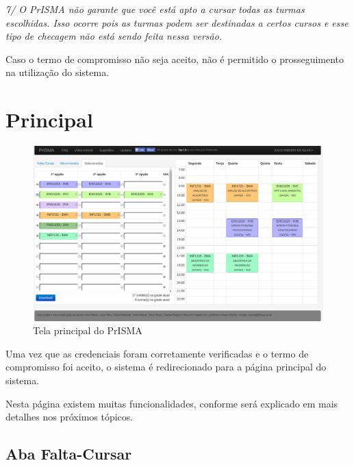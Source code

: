 \documentclass[graduacao,brazil]{ThesisPUC}
\begin{document}
\textit{7/ O PrISMA não garante que você está apto a cursar todas as turmas escolhidas. Isso ocorre pois as turmas podem ser destinadas a certos cursos e esse tipo de checagem não está sendo feita nessa versão.}

\vspace{3 mm}

Caso o termo de compromisso não seja aceito, não é permitido o prosseguimento na  utilização do sistema.

\section{Principal}

\begin{figure}[H]
    \centering
    \includegraphics[width=0.85\linewidth]{img/v3_selecionadas.png}
    \caption{Tela principal do PrISMA}
\end{figure}

Uma vez que as credenciais foram corretamente verificadas e o termo de compromisso foi aceito, o sistema é redirecionado para a página principal do sistema. 

Nesta página existem muitas funcionalidades, conforme será explicado em mais detalhes nos próximos tópicos.

\subsection{Aba Falta-Cursar}
\end{document}
